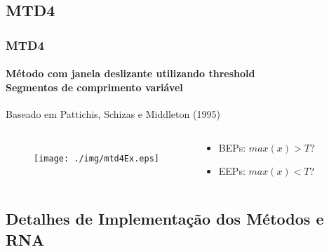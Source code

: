 \documentclass{beamer}
\begin{document}
	\subsection[MTD4]{MTD4}
	\begin{frame}
		\frametitle{MTD4}
		\framesubtitle{Método com janela deslizante utilizando threshold \\ Segmentos de comprimento variável}
		
		Baseado em Pattichis, Schizas e Middleton (1995)
		
		\begin{columns}[c]
			
				\begin{figure}
					\begin{center}
						\texttt{[image: ./img/mtd4Ex.eps]}
					\end{center}
				\end{figure}
		
				\begin{exampleblock}{}
					\begin{itemize}
						\item BEPs: $max(x) > T$? 
						\item EEPs: $max(x) < T$?
					\end{itemize}
				\end{exampleblock}
		\end{columns}
	\end{frame}
	
%		

	\subsection[Implementação]{Detalhes de Implementação dos Métodos e RNA}
	
\end{document}
